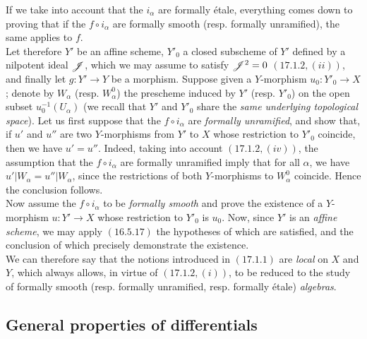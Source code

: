 If we take into account that the $i_\alpha$ are formally \'etale, everything comes down to proving that if the $f \circ i_\alpha$ are formally smooth (resp. formally unramified), the same applies to $f$.\\

Let therefore $Y'$ be an affine scheme, $Y'_0$ a closed subscheme of $Y'$ defined by a nilpotent ideal $\mathscr{J}$, which we may assume to satisfy $\mathscr{J}^2 = 0$ $(\hyperref[IV.17.1.2]{17.1.2}, (ii))$, and finally let $g : Y' \to Y$ be a morphism. Suppose given a $Y$-morphism $u_0 : Y'_0 \to X$; denote by $W_\alpha$ (resp. $W^0 _\alpha$) the prescheme induced by $Y'$ (resp. $Y'_0$) on the open subset $u_0 ^{-1}(U_\alpha)$ (we recall that $Y'$ and $Y'_0$ share the \emph{same underlying topological space}). Let us first suppose that the $f \circ i_\alpha$ are \emph{formally unramified}, and show that, if $u'$ and $u''$ are two $Y$-morphisms from $Y'$ to $X$ whose restriction to $Y'_0$ coincide, then we have $u' = u''$. Indeed, taking into account $(\hyperref[IV.17.1.2]{17.1.2}, (iv))$, the assumption that the $f \circ i_\alpha$ are formally unramified imply that for all $\alpha$, we have $u'|W_\alpha = u''|W_\alpha$, since the restrictions of both $Y$-morphisms to $W^0 _\alpha$ coincide. Hence the conclusion follows.\\

Now assume the $f \circ i_\alpha$ to be \emph{formally smooth} and prove the existence of a $Y$-morphism $u : Y' \to X$ whose restriction to $Y'_0$ is $u_0$. Now, since $Y'$ is an \emph{affine scheme}, we may apply $(\hyperref[IV.16.5.17]{16.5.17})$ the hypotheses of which are satisfied, and the conclusion of which precisely demonstrate the existence.\\

We can therefore say that the notions introduced in $(\hyperref[IV.17.1.1]{17.1.1})$ are \emph{local} on $X$ and $Y$, which always allows, in virtue of $(\hyperref[IV.17.1.2]{17.1.2}, (i))$, to be reduced to the study of formally smooth (resp. formally unramified, resp. formally \'etale) \emph{algebras}.
\subsection{General properties of differentials}
\label{subsection:IV.17.2}





